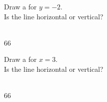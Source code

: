 \documentclass[12pt,letterpaper]{memoir}
\begin{document}
%
%
\myProblemsWithContent
{
    Draw a  for $y = -2$. \\
    Is the line horizontal or vertical?\\
    \\
    \vspace{-2\onelineskip}
    \begin{flushright}
        \begin{myTikzpictureGrid}{0.5} {6}{6}
        \end{myTikzpictureGrid}
    \end{flushright}
}
{
    Draw a  for $x = 3$. \\
    Is the line horizontal or vertical?\\
    \\
    \vspace{-2\onelineskip}
    \begin{flushright}
        \begin{myTikzpictureGrid}{0.5} {6}{6}
        \end{myTikzpictureGrid}
    \end{flushright}
}
\end{document}
